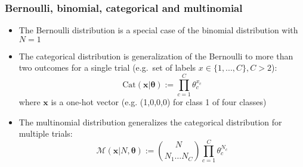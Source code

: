 \documentclass[usenames,dvipsnames,smaller%
]{beamer}
\newcommand{\?}{\stackrel{?}{=}}
\begin{document}
\begin{frame}
  \frametitle{Bernoulli, binomial, categorical and multinomial}
  \begin{itemize}
  \item The Bernoulli distribution is a special case of the binomial distribution with $N = 1$\pause
  \item The categorical distribution is generalization of the Bernoulli to more than two outcomes for a single trial (e.g.\ set of labels $x \in \{1, ..., C\}, C > 2$):
    \pause
    \begin{equation}
      \mathrm{Cat}(\bm x| \bm{\theta}) := \prod_{c=1}^{C} \theta_c^{x_c}
    \end{equation}
    where $\bm x$ is a one-hot vector (e.g. (1,0,0,0) for class 1 of four classes)
    \pause
  \item The multinomial distribution generalizes the categorical distribution for multiple trials: \pause
    \begin{equation}
      \mathscr{M}(\bm{x}| N, \bm{\theta}) := {N \choose {N_1 \ldots N_C}} \prod_{c=1}^C\theta_c^{N_c}
    \end{equation}
  \end{itemize}
\end{frame}
\end{document}
